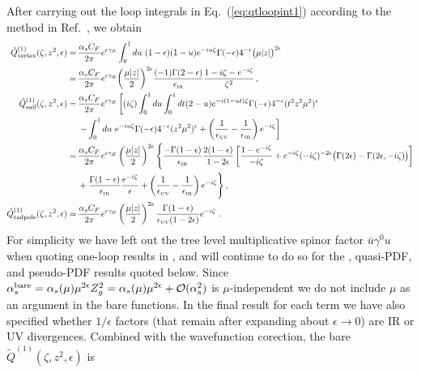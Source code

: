 \begin{widetext}
After carrying out the loop integrals in Eq.~(\ref{eq:qtloopint1}) according to the method in Ref.~\cite{Ji:2017rah}, we obtain
\begin{align}\label{eq:1loopdiagram}
\tilde{Q}^{(1)}_{\rm vertex}(\zeta,z^2,\epsilon)
=\,& {\alpha_sC_F\over 2\pi}e^{\epsilon\gamma_E} \int_0^1 du\ (1-\epsilon)(1-u) e^{-iu \zeta}\Gamma(-\epsilon) 4^{-\epsilon} \big(\mu |z|\big)^{2\epsilon}
  \\
 =\,& {\alpha_sC_F\over 2\pi} e^{\epsilon\gamma_E}\biggl({\mu|z|\over2}\biggr)^{2\epsilon}
 \frac{(-1)\Gamma(2-\epsilon)}{\epsilon_{\mbox{\tiny IR}}}
 {1-i\zeta - e^{-i\zeta}\over \zeta^2}
  \,, \nonumber\\
\tilde{Q}^{(1)}_{\rm sail}(\zeta,z^2,\epsilon)
=\, & {\alpha_sC_F\over 2\pi}  e^{\epsilon\gamma_E}\left[(i\zeta) \int_0^1 du \int_0^1 dt (2-u) e^{-i(1-ut)\zeta} \Gamma(-\epsilon) 4^{-\epsilon}(t^2z^2\mu^2)^{\epsilon}\right.
  \nonumber\\
 &\left. -\int_0^1 du \ e^{-iu \zeta}\Gamma(-\epsilon) 4^{-\epsilon}(z^2\mu^2)^{\epsilon}  + \left({1\over\epsilon_{\mbox{\tiny UV}}} - {1\over \epsilon_{\mbox{\tiny IR}}}\right) e^{-i\zeta}\right]
  \nonumber\\
 =\,& {\alpha_sC_F\over 2\pi} e^{\epsilon\gamma_E} \left({\mu|z|\over2}\right)^{2\epsilon}
 \Bigg\{\frac{-\Gamma(1-\epsilon)}{\epsilon_{\mbox{\tiny IR}}}
 {2(1-\epsilon)\over 1-2\epsilon} \left[{1-e^{-i\zeta}\over -i\zeta} + e^{-i\zeta}(-i\zeta)^{-2\epsilon}\big(\Gamma(2\epsilon)-\Gamma(2\epsilon,-i\zeta)\big)
 \right]
  \nn\\
 & + {\Gamma(1-\epsilon)\over \epsilon_{\mbox{\tiny IR}} } \frac{e^{-i\zeta}}{\epsilon} + \left({1\over\epsilon_{\mbox{\tiny UV}}} - {1\over \epsilon_{\mbox{\tiny IR}}}\right) e^{-i\zeta} \Bigg\}
  \,, \nn\\
\tilde{Q}^{(1)}_{\rm tadpole}(\zeta,z^2,\epsilon)
=\, & {\alpha_sC_F\over 2\pi} e^{\epsilon\gamma_E}\left({\mu|z|\over2}\right)^{2\epsilon}  {\Gamma(1-\epsilon)\over \epsilon_{\mbox{\tiny UV}} (1-2\epsilon)}e^{-i\zeta}
 \ . \nn
\end{align}
For simplicity we have left out the tree level multiplicative spinor factor $\bar u\gamma^0 u$ when quoting one-loop results in , and will continue to do so for the \spcorr, quasi-PDF, and pseudo-PDF results quoted below.
Since $\alpha_s^{\rm bare}=\alpha_s(\mu) \mu^{2\epsilon} Z_g^2 = \alpha_s(\mu) \mu^{2\epsilon} + {\cal O}(\alpha_s^2)$ is $\mu$-independent we do not include $\mu$ as an argument in the bare functions.
In the final result for each term we have also specified whether $1/\epsilon$ factors (that remain after expanding about $\epsilon\to 0$) are IR or UV divergences. Combined with the wavefunction corection, the bare \spcorr $\tilde{Q}^{(1)}(\zeta,z^2,\epsilon)$ is

\end{widetext}
